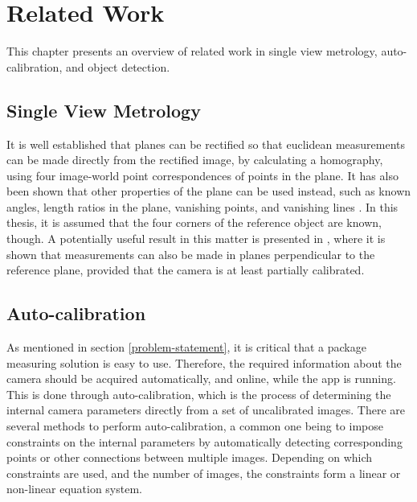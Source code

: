 \chapter{Related Work}
This chapter presents an overview of related work in single view metrology, auto-calibration, and object detection.

\section{Single View Metrology}
It is well established that planes can be rectified so that euclidean measurements can be made directly from the rectified image, by calculating a homography, using four image-world point correspondences of points in the plane. %
It has also been shown that other properties of the plane can be used instead, such as known angles, length ratios in the plane, vanishing points, and vanishing lines \cite{liebowitz1998metric} \cite{criminisi2000single}.
In this thesis, it is assumed that the four corners of the reference object are known, though.
A potentially useful result in this matter is presented in \cite{huang2004new}, where it is shown that measurements can also be made in planes perpendicular to the reference plane, provided that the camera is at least partially calibrated.

\section{Auto-calibration}
As mentioned in section \ref{problem-statement}, it is critical that a package measuring solution is easy to use.
Therefore, the required information about the camera should be acquired automatically, and online, while the app is running.
This is done through auto-calibration, which is the process of determining the internal camera parameters directly from a set of uncalibrated images.
There are several methods to perform auto-calibration, a common one being to impose constraints on the internal parameters by automatically detecting corresponding points or other connections between multiple images. 
Depending on which constraints are used, and the number of images, the constraints form a linear or non-linear equation system. \cite[458-469]{hartley-zisserman} %

